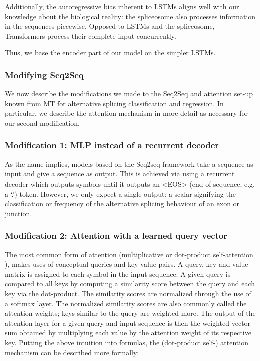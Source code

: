 Additionally, the autoregressive bias inherent to LSTMs aligns well with our knowledge about the biological reality: the spliceosome also processes information in the sequences piecewise. Opposed to LSTMs and the spliceosome, Transformers process their complete input concurrently.


Thus, we base the encoder part of our model on the simpler LSTMs. 

\subsubsection{Modifying Seq2Seq}
We now describe the modifications we made to the Seq2Seq and attention set-up known from MT for alternative splicing classification and regression. In particular, we describe the attention mechanism in more detail as necessary for our second modification.



\subsubsection{Modification 1: MLP instead of a recurrent decoder}
As the name implies, models based on the Seq2seq framework take a sequence as input and give a sequence as output. This is achieved via using a recurrent decoder which outputs symbols until it outputs an <EOS> (end-of-sequence, e.g. a `.') token.
However, we only expect a single output: a scalar signifying the classification or frequency of the alternative splicing behaviour of an exon or junction. 
\subsubsection{Modification 2: Attention with a learned query vector}
The most common form of attention (multiplicative or dot-product self-attention \cite{allyouneed}), makes uses of conceptual queries and key-value pairs. A query, key and value matrix is assigned to each symbol in the input sequence. A given query is compared to all keys by computing a similarity score between the query and each key via the dot-product. The similarity scores are normalized through the use of a softmax layer. The normalized similarity scores are also commonly called the attention weights; keys similar to the query are weighted more. The output of the attention layer for a given query and input sequence is then the weighted vector sum obtained by multiplying each value by the attention weight of its respective key.
Putting the above intuition into formulas, the (dot-product self-) attention mechanism can be described more formally:

